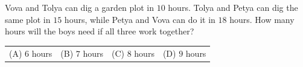 Vova and Tolya can dig a garden plot in $10$ hours. Tolya and Petya can dig the same plot in $15$ hours, while Petya and Vova can do it in $18$ hours. How many hours will the boys need if all three work together?



\begin{tabular}{llll}
(A) $6$ hours & (B) $7$ hours & (C) $8$ hours & (D) $9$ hours
\end{tabular}
